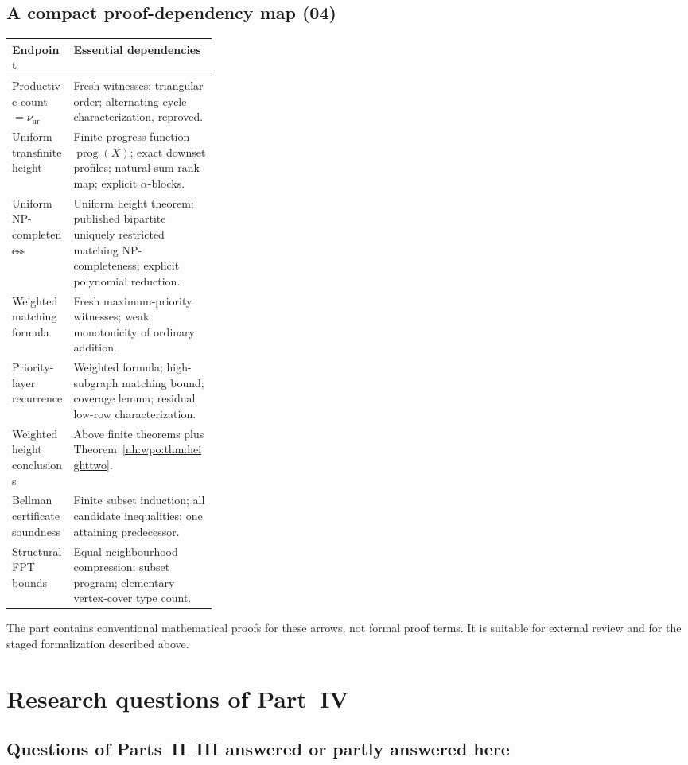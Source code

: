 \documentclass[11pt,a4paper]{article}
\theoremstyle{definition}
\theoremstyle{remark}
\newcommand{\nuur}{\nu_{\mathrm{ur}}}
\begin{document}
\subsection{A compact proof-dependency map (04)}
\begin{center}\small
\begin{tabularx}{\linewidth}{@{}p{0.30\linewidth}X@{}}
\toprule
Endpoint & Essential dependencies\\
\midrule
Productive count $=\nuur$ & Fresh witnesses; triangular order;
alternating-cycle characterization, reproved.\\
Uniform transfinite height & Finite progress function
$\operatorname{prog}(X)$; exact downset profiles; natural-sum rank map;
explicit $\alpha$-blocks.\\
Uniform NP-completeness & Uniform height theorem; published bipartite
uniquely restricted matching NP-completeness; explicit polynomial reduction.\\
Weighted matching formula & Fresh maximum-priority witnesses; weak
monotonicity of ordinary addition.\\
Priority-layer recurrence & Weighted formula; high-subgraph matching bound;
coverage lemma; residual low-row characterization.\\
Weighted height conclusions & Above finite theorems plus
Theorem~\ref{nh:wpo:thm:heighttwo}.\\
Bellman certificate soundness & Finite subset induction; all candidate
inequalities; one attaining predecessor.\\
Structural FPT bounds & Equal-neighbourhood compression; subset program;
elementary vertex-cover type count.\\
\bottomrule
\end{tabularx}
\end{center}
The part contains conventional mathematical proofs for these arrows, not
formal proof terms. It is suitable for external review and for the staged
formalization described above.

\section{Research questions of Part~IV}\label{nh:ur:sec:questions}
\setcounter{equation}{0}

\subsection{Questions of Parts~II--III answered or partly answered here}
\end{document}
